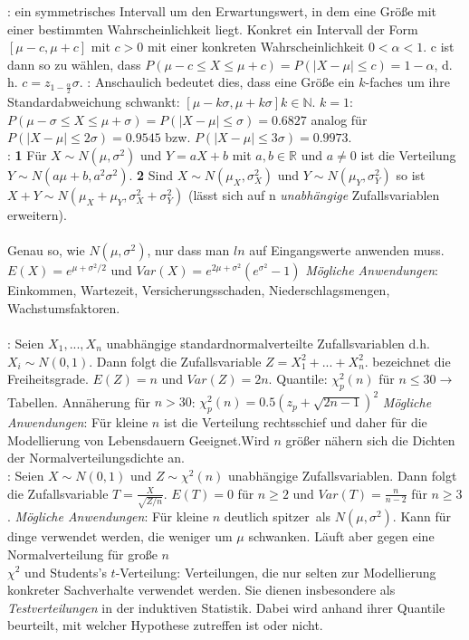 : ein symmetrisches Intervall um den Erwartungswert, in dem eine Größe mit einer bestimmten Wahrscheinlichkeit liegt. Konkret ein Intervall der Form $[\mu - c, \mu + c]$ mit $c > 0$ mit einer konkreten Wahrscheinlichkeit $0 < \alpha < 1$. c ist dann so zu wählen, dass $P(\mu - c \le X \le \mu + c) = P(|X - \mu| \le c) = 1 - \alpha$, d. h. $c = z_{1 - \frac{\alpha}{2}} \sigma$. : Anschaulich bedeutet dies, dass eine Größe ein $k$-faches um ihre Standardabweichung schwankt: $[\mu - k\sigma, \mu + k\sigma] k\in \mathds{N}$. $k = 1$: $P(\mu - \sigma \le X \le \mu + \sigma) = P(|X - \mu| \le \sigma) = 0.6827$ analog für $P(|X - \mu| \le 2\sigma) = 0.9545$ bzw. $P(|X - \mu| \le 3\sigma) = 0.9973$.\\
: \textbf{1} Für $X \sim N(\mu, \sigma^2)$ und $Y = a X + b$ mit $a, b \in \mathds{R}$ und $a \neq 0$ ist die Verteilung $Y \sim N(a\mu + b,a^2 \sigma^2)$. \textbf{2} Sind $X \sim N(\mu_X, \sigma_X^2)$ und $Y \sim N(\mu_Y, \sigma_Y^2)$ so ist $X + Y \sim N(\mu_X + \mu_Y, \sigma_X^2 + \sigma_Y^2)$ (lässt sich auf n \emph{unabhängige} Zufallsvariablen erweitern).\\\\
 Genau so, wie $N(\mu, \sigma^2)$, nur dass man $ln$ auf Eingangswerte anwenden muss. $E(X) = e^{\mu + \sigma^2/2}$ und $Var(X) = e^{2\mu + \sigma^2}(e^{\sigma^2} - 1)$ \emph{Mögliche Anwendungen}: Einkommen, Wartezeit, Versicherungsschaden, Niederschlagsmengen, Wachstumsfaktoren.\\\\

: Seien $X_1, ..., X_n$ unabhängige standardnormalverteilte Zufallsvariablen d.h. $X_i \sim N(0, 1)$. Dann folgt die Zufallsvariable $Z = X_1^2 + ... + X_n^2$.  bezeichnet die Freiheitsgrade. $E(Z) = n$ und $Var(Z) = 2n$. Quantile: $\chi_p^2(n)$ für $n \le 30 \rightarrow$ Tabellen. Annäherung für $n > 30$: $\chi_p^2(n)=0.5(z_p + \sqrt{2n - 1})^2$  \emph{Mögliche Anwendungen}: Für kleine $n$ ist die Verteilung rechtsschief und daher für die Modellierung von Lebensdauern Geeignet.Wird $n$ größer nähern  sich die Dichten der Normalverteilungsdichte an.\\
: Seien $X \sim N(0, 1)$ und $Z \sim \chi^2(n)$ unabhängige Zufallsvariablen. Dann folgt die Zufallsvariable $T = \frac{X}{\sqrt{Z/n}}$. $E(T) = 0$ für $n \ge 2$ und $Var(T) = \frac{n}{n-2}$ für $n \ge 3$. \emph{Mögliche Anwendungen}: Für kleine $n$ deutlich \glqq spitzer\grqq\, als $N(\mu, \sigma^2)$. Kann für dinge verwendet werden, die weniger um $\mu$ schwanken. Läuft aber gegen eine Normalverteilung für große $n$\\
$\chi^2$ und Students's $t$-Verteilung: Verteilungen, die nur selten zur Modellierung konkreter Sachverhalte verwendet werden. Sie dienen insbesondere als \emph{Testverteilungen} in der induktiven Statistik. Dabei wird anhand ihrer Quantile beurteilt, mit welcher Hypothese zutreffen ist oder nicht.

